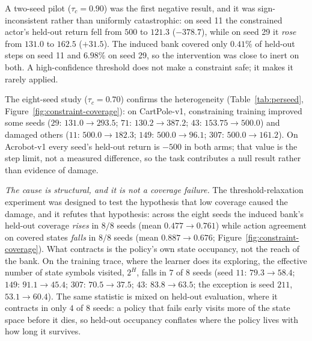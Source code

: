 \documentclass[11pt]{article}
\begin{document}
A two-seed pilot ($\tau_c=0.90$) was the first negative result, and it was sign-inconsistent rather
than uniformly catastrophic: on seed 11 the constrained actor's held-out return fell from $500$ to
$121.3$ ($-378.7$), while on seed 29 it \emph{rose} from $131.0$ to $162.5$ ($+31.5$). The induced
bank covered only $0.41\%$ of held-out steps on seed 11 and $6.98\%$ on seed 29, so the intervention
was close to inert on both. A high-confidence threshold does not make a constraint safe; it makes it
rarely applied.

The eight-seed study ($\tau_c=0.70$) confirms the heterogeneity
(Table~\ref{tab:perseed}, Figure~\ref{fig:constraint-coverage}): on CartPole-v1, constraining training
improved some seeds ($29$: $131.0\rightarrow293.5$; $71$: $130.2\rightarrow387.2$; $43$:
$153.75\rightarrow500.0$) and damaged others ($11$: $500.0\rightarrow182.3$; $149$:
$500.0\rightarrow96.1$; $307$: $500.0\rightarrow161.2$). On Acrobot-v1 every seed's held-out return is
$-500$ in both arms; that value is the step limit, not a measured difference, so the task contributes
a null result rather than evidence of damage.

\emph{The cause is structural, and it is not a coverage failure.} The threshold-relaxation experiment
was designed to test the hypothesis that low coverage caused the damage, and it refutes that
hypothesis: across the eight seeds the induced bank's held-out coverage \emph{rises} in $8/8$ seeds
(mean $0.477\rightarrow0.761$) while action agreement on covered states \emph{falls} in $8/8$ seeds
(mean $0.887\rightarrow0.676$; Figure~\ref{fig:constraint-coverage}). What contracts is the policy's
own state occupancy, not the reach of the bank. On the training trace, where the learner does its
exploring, the effective number of state symbols visited, $2^{H}$, falls in $7$ of $8$ seeds (seed
$11$: $79.3\rightarrow58.4$; $149$: $91.1\rightarrow45.4$; $307$: $70.5\rightarrow37.5$; $43$:
$83.8\rightarrow63.5$; the exception is seed $211$, $53.1\rightarrow60.4$). The same statistic is
mixed on held-out evaluation, where it contracts in only $4$ of $8$ seeds: a policy that fails early
visits more of the state space before it dies, so held-out occupancy conflates where the policy
lives with how long it survives.
\end{document}
